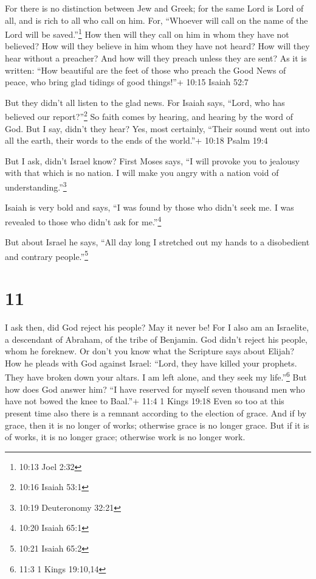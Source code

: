  For there is no distinction between Jew and Greek; for the
same Lord is Lord of all, and is rich to all who call on him.
 For, ``Whoever will call on the name of the Lord will be
saved.''\footnote{10:13 Joel 2:32}  How then will they call
on him in whom they have not believed? How will they believe in him whom
they have not heard? How will they hear without a preacher?
 And how will they preach unless they are sent? As it is
written: ``How beautiful are the feet of those who preach the Good News
of peace, who bring glad tidings of good things!''+ 10:15 Isaiah 52:7

 But they didn't all listen to the glad news. For Isaiah
says, ``Lord, who has believed our report?''\footnote{10:16 Isaiah 53:1}
 So faith comes by hearing, and hearing by the word of God.
 But I say, didn't they hear? Yes, most certainly, ``Their
sound went out into all the earth, their words to the ends of the
world.''+ 10:18 Psalm 19:4

 But I ask, didn't Israel know? First Moses says, ``I will
provoke you to jealousy with that which is no nation. I will make you
angry with a nation void of understanding.''\footnote{10:19 Deuteronomy
  32:21}

 Isaiah is very bold and says, ``I was found by those who
didn't seek me. I was revealed to those who didn't ask for
me.''\footnote{10:20 Isaiah 65:1}

 But about Israel he says, ``All day long I stretched out
my hands to a disobedient and contrary people.''\footnote{10:21 Isaiah
  65:2}

\hypertarget{section-10}{%
\section{11}\label{section-10}}

 I ask then, did God reject his people? May it never be! For
I also am an Israelite, a descendant of Abraham, of the tribe of
Benjamin.  God didn't reject his people, whom he foreknew.
Or don't you know what the Scripture says about Elijah? How he pleads
with God against Israel:  ``Lord, they have killed your
prophets. They have broken down your altars. I am left alone, and they
seek my life.''\footnote{11:3 1 Kings 19:10,14}  But how
does God answer him? ``I have reserved for myself seven thousand men who
have not bowed the knee to Baal.''+ 11:4 1 Kings 19:18  Even
so too at this present time also there is a remnant according to the
election of grace.  And if by grace, then it is no longer of
works; otherwise grace is no longer grace. But if it is of works, it is
no longer grace; otherwise work is no longer work.

